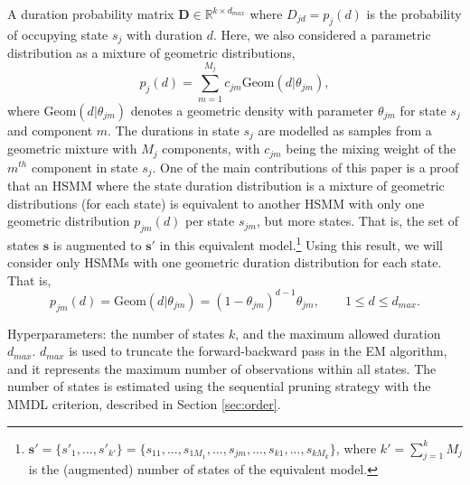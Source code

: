 \documentclass[extendedabs]{recpad2k}
\begin{document}
    \textbullet A duration probability matrix $\boldsymbol{D}\in \mathbb{R}^{k\times d_{max}}$ where $D_{jd}=p_j(d)$ is the probability of occupying state $s_j$ with duration $d$. Here, we also considered a parametric distribution as a mixture of geometric distributions,
    \begin{equation}
        p_j(d) = \sum_{m=1}^{M_j} c_{jm} \text{Geom}(d|\theta_{jm}),
        \label{mix_geom}
    \end{equation}
    where $\text{Geom}(d|\theta_{jm})$ denotes a geometric density with parameter $\theta_{jm}$ for state $s_j$ and component $m$. The durations in state $s_j$ are modelled as samples from a geometric mixture with $M_j$ components, with $c_{jm}$ being the mixing weight of the $m^{th}$ component in state $s_j$. One of the main contributions of this paper is a proof that an HSMM where the state duration distribution is a mixture of geometric distributions (for each state) is equivalent to another HSMM with only one geometric distribution $p_{jm}(d)$ per state $s_{jm}$, but more states. That is, the set of states $\mathbf{s}$ is augmented to $\mathbf{s'}$ in this equivalent model.\footnote{$\mathbf{s'}=\{s'_1,...,s'_{k'}\}=\{s_{11},...,s_{1M_1},...,s_{jm},...,s_{k1},...,s_{kM_k}\}$, where $k'=\sum_{j=1}^k M_j$ is the (augmented) number of states of the equivalent model.} %
    Using this result, we will consider only HSMMs with one geometric duration distribution for each state. That is, %
    \begin{equation}
        p_{jm}(d) = \text{Geom}(d|\theta_{jm}) = (1-\theta_{jm})^{d-1}\theta_{jm}, \qquad 1\leq d \leq d_{max}.
    \label{geom}
    \end{equation}
    
    \textbullet Hyperparameters: the number of states $k$, and the maximum allowed duration $d_{max}$. $d_{max}$ is used to truncate the forward-backward pass in the EM algorithm, and it represents the maximum number of observations within all states. The number of states is estimated using the sequential pruning strategy with the MMDL criterion, described in Section \ref{sec:order}.
\end{document}
